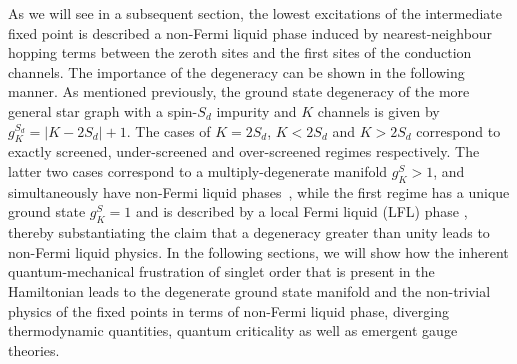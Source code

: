 \documentclass[reprint,prb,superscriptaddress]{revtex4-2}
\begin{document}
As we will see in a subsequent section, the lowest excitations of the intermediate fixed point is described a non-Fermi liquid phase induced by nearest-neighbour hopping terms between the zeroth sites and the first sites of the conduction channels. The importance of the degeneracy can be shown in the following manner. As mentioned previously, the ground state degeneracy of the more general star graph with a spin-\({S_d}\) impurity and \(K\) channels is given by \(g^{S_d}_K = |K - 2{S_d}|+1\). The cases of \(K=2{S_d}\), \(K<2{S_d}\) and \(K>2{S_d}\) correspond to exactly screened, under-screened and over-screened regimes respectively. {The latter two cases correspond to a multiply-degenerate manifold \(g^S_K > 1\), and simultaneously have non-Fermi liquid phases~\cite{Noz_blandin_1980,Gan_Andrei_Coleman_1993,emery_kivelson,Gan_mchannel_1994,Tsvelick_Weigmann_mchannel_1984,Tsvelick_weigmann_mchannel_1985,parcollet_olivier_large_N,kimura_taro_Su_N_kondo,PhysRevB.73.224445,cox_jarrell_two_channel_rev,affleck_1991_overscreen,Coleman_tsvelik,affleck1993exact,coleman_pepin_2003,roch_nicolas_costi_2009,schiller_avraham_2008,Durganandini_2011}, while the first regime has a unique ground state \(g^S_K = 1\) and is described by a local Fermi liquid (LFL) phase \cite{wilson1975,nozieres1974fermi,Noz_blandin_1980,andreiKondoreview,tsvelickKondoreview}, thereby substantiating the claim that a degeneracy greater than unity leads to non-Fermi liquid physics.} In the following sections, we will show how the inherent quantum-mechanical frustration of singlet order that is present in the Hamiltonian leads to the degenerate ground state manifold and the non-trivial physics of the fixed points in terms of non-Fermi liquid phase, diverging thermodynamic quantities, quantum criticality as well as emergent gauge theories.
\end{document}
